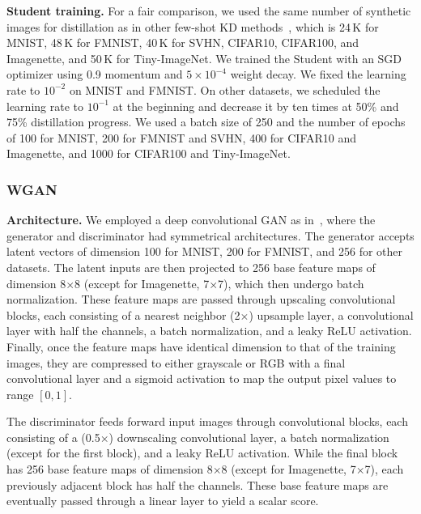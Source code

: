 \begin{foldable}
  \textbf{Student training.} For a fair comparison, we used the same number of synthetic images for distillation as in other few-shot \ac{KD} methods~\cite{kimura2018few,wang2020neural,nguyen2022black}, which is 24\,K for MNIST, 48\,K for FMNIST, 40\,K for SVHN, CIFAR10, CIFAR100, and Imagenette, and 50\,K for Tiny-ImageNet.
  We trained the Student with an SGD optimizer using 0.9 momentum and $5 \times 10^{-4}$ weight decay.
  We fixed the learning rate to $10^{-2}$ on MNIST and FMNIST.
  On other datasets, we scheduled the learning rate to $10^{-1}$ at the beginning and decrease it by ten times at 50\% and 75\% distillation progress.
  We used a batch size of 250 and the number of epochs of 100 for MNIST, 200 for FMNIST and SVHN, 400 for CIFAR10 and Imagenette, and 1000 for CIFAR100 and Tiny-ImageNet.
\end{foldable}

\subsubsection{WGAN}
\begin{foldable}
  \textbf{Architecture.} We employed a deep convolutional GAN as in~\cite{radford2015unsupervised}, where the generator and discriminator had symmetrical architectures.
  The generator accepts latent vectors of dimension 100 for MNIST, 200 for FMNIST, and 256 for other datasets.
  The latent inputs are then projected to 256 base feature maps of dimension 8$\times$8 (except for Imagenette, 7$\times$7), which then undergo batch normalization.
  These feature maps are passed through upscaling convolutional blocks, each consisting of a nearest neighbor (2$\times$) upsample layer, a convolutional layer with half the channels, a batch normalization, and a leaky ReLU activation.
  Finally, once the feature maps have identical dimension to that of the training images, they are compressed to either grayscale or RGB with a final convolutional layer and a sigmoid activation to map the output pixel values to range $[0, 1]$.

  The discriminator feeds forward input images through convolutional blocks, each consisting of a (0.5$\times$) downscaling convolutional layer, a batch normalization (except for the first block), and a leaky ReLU activation.
  While the final block has 256 base feature maps of dimension 8$\times$8 (except for Imagenette, 7$\times$7), each previously adjacent block has half the channels.
  These base feature maps are eventually passed through a linear layer to yield a scalar score.
\end{foldable}

